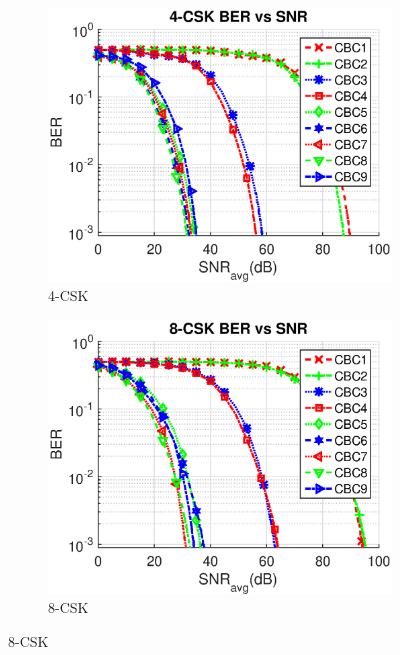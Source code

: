 \documentclass[10pt,letterpaper]{article}
\begin{document}
\begin{figure}[t]
	\centering
		\begin{subfigure}{0.32\textwidth}
		\centering
			\includegraphics[trim={0.0in 0.0in 0.1in 0.3in}, clip=true, width=\textwidth]{M04_4-CSK_BERvsSNR_NL.eps}
			\caption{4-CSK}
			\label{fig4SNR_NL}
		\end{subfigure}
		\begin{subfigure}{0.32\textwidth}
		\centering
			\includegraphics[trim={0.0in 0.0in 0.1in 0.3in}, clip=true, width=\textwidth]{M08_8-CSK_BERvsSNR_NL.eps}
			\caption{8-CSK}
			\label{fig8SNR_NL}
		\end{subfigure}

\end{figure}
\end{document}
